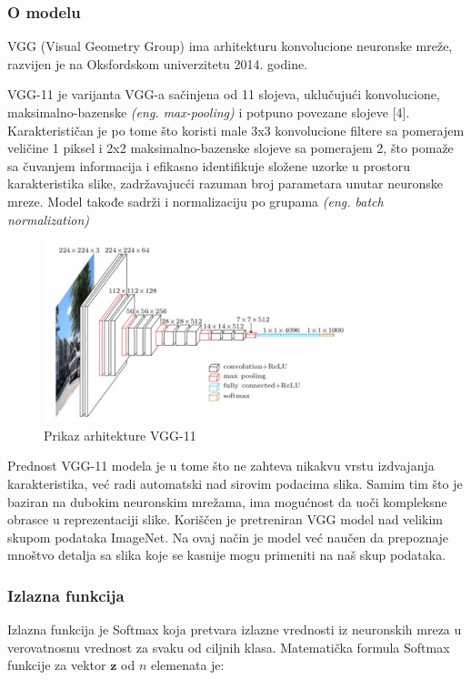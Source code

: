 \documentclass{article}
\begin{document}
\subsubsection{O modelu}

VGG (Visual Geometry Group) ima arhitekturu konvolucione neuronske mreže, razvijen je na Oksfordskom univerzitetu 2014. godine.
\par
VGG-11 je varijanta VGG-a sačinjena od 11 slojeva, uklučujući konvolucione, maksimalno-bazenske \textit{(eng. max-pooling)} i potpuno povezane slojeve [4]. Karakterističan je po tome što koristi male 3x3 konvolucione filtere sa pomerajem veličine 1 piksel i 2x2 maksimalno-bazenske slojeve sa pomerajem 2, što pomaže sa čuvanjem informacija i efikasno identifikuje složene uzorke u prostoru karakteristika slike, zadržavajucći razuman broj parametara unutar neuronske mreze. Model takođe sadrži i normalizaciju po grupama \textit{(eng. batch normalization)}

\begin{figure}[H]
    \centering
    \includegraphics[width=0.8\textwidth]{vgg.jpg} 
    \caption{Prikaz arhitekture VGG-11} 
    \label{Arhitektura VGG11}
\end{figure}

Prednost VGG-11 modela je u tome što ne zahteva nikakvu vrstu izdvajanja karakteristika, već radi automatski nad sirovim podacima slika. Samim tim što je baziran na dubokim neuronskim mrežama, ima mogućnost da uoči kompleksne obrasce u reprezentaciji slike. Koriščen je pretreniran VGG model nad velikim skupom podataka ImageNet. Na ovaj način je model već naučen da prepoznaje mnoštvo detalja sa slika koje se kasnije mogu primeniti na naš skup podataka.

\subsubsection{Izlazna funkcija}
Izlazna funkcija je Softmax koja pretvara izlazne vrednosti iz neuronskih mreza u verovatnosnu vrednost za svaku od ciljnih klasa.
Matematička formula Softmax funkcije za vektor \(\mathbf{z}\) od \(n\) elemenata je:
\end{document}
